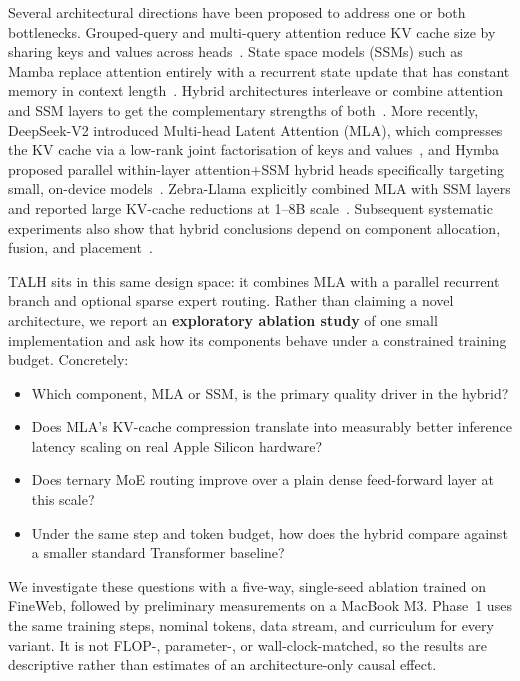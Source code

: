 \documentclass[conference]{IEEEtran}
\begin{document}
Several architectural directions have been proposed to address one or both
bottlenecks. Grouped-query and multi-query attention reduce KV cache size by
sharing keys and values across heads~\cite{gqa2023}. State space models
(SSMs) such as Mamba replace attention entirely with a recurrent state update
that has constant memory in context length~\cite{mamba2023}. Hybrid
architectures interleave or combine attention and SSM layers to get the
complementary strengths of both~\cite{h3_2022,jamba2024,samba2024}. More
recently, DeepSeek-V2 introduced Multi-head Latent Attention (MLA), which
compresses the KV cache via a low-rank joint factorisation of keys and
values~\cite{deepseekv2}, and Hymba proposed parallel within-layer
attention+SSM hybrid heads specifically targeting small, on-device
models~\cite{hymba2024}. Zebra-Llama explicitly combined MLA with SSM layers
and reported large KV-cache reductions at 1--8B scale~\cite{zebra2025}.
Subsequent systematic experiments also show that hybrid conclusions depend on
component allocation, fusion, and placement~\cite{hybrids2026}.

TALH sits in this same design space: it combines MLA with a parallel recurrent
branch and optional sparse expert routing. Rather than claiming a novel
architecture, we report an \textbf{exploratory ablation study} of one small
implementation and ask how its components behave under a constrained training
budget. Concretely:

\begin{itemize}
  \item Which component, MLA or SSM, is the primary quality driver in the hybrid?
  \item Does MLA's KV-cache compression translate into measurably better
        inference latency scaling on real Apple Silicon hardware?
  \item Does ternary MoE routing improve over a plain dense feed-forward layer
        at this scale?
  \item Under the same step and token budget, how does the hybrid compare
        against a smaller standard Transformer baseline?
\end{itemize}

We investigate these questions with a five-way, single-seed ablation trained on
FineWeb, followed by preliminary measurements on a MacBook M3. Phase~1 uses the
same training steps, nominal tokens, data stream, and curriculum for every
variant. It is not FLOP-, parameter-, or wall-clock-matched, so the results are
descriptive rather than estimates of an architecture-only causal effect.
\end{document}
